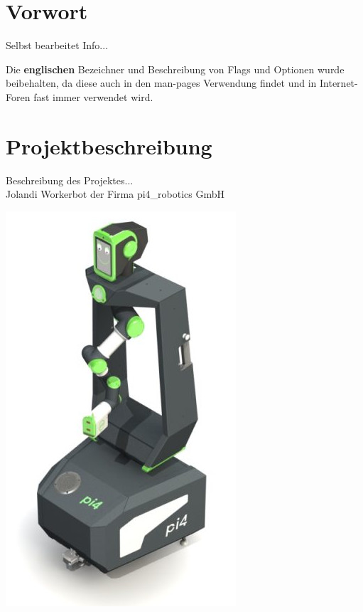 \section{Vorwort}
Selbst bearbeitet Info...

Die \textbf{englischen} Bezeichner und Beschreibung von Flags und Optionen wurde beibehalten, da diese auch in den man-pages Verwendung findet und in Internet-Foren fast immer verwendet wird.

\section{Projektbeschreibung}

Beschreibung des Projektes...\\

Jolandi Workerbot der Firma pi4\_robotics GmbH\\

\begin{minipage}{\textwidth}
    \begin{center}
        
        \includegraphics[scale=0.5]{img/jolandi.jpg} 
    \end{center}
\end{minipage}

